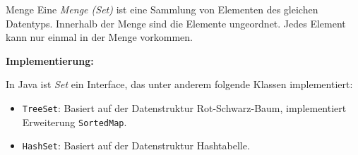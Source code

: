 \documentclass[german]{../spicker}
\begin{document}
\begin{defi}{Menge}
    Eine \emph{Menge (Set)} ist eine Sammlung von Elementen des gleichen Datentyps.
    Innerhalb der Menge sind die Elemente ungeordnet.
    Jedes Element kann nur einmal in der Menge vorkommen.

    \textbf{Implementierung:}

    In Java ist \emph{Set} ein Interface, das unter anderem folgende Klassen implementiert:
    \begin{itemize}
        \item \texttt{TreeSet}: Basiert auf der Datenstruktur Rot-Schwarz-Baum, implementiert Erweiterung \texttt{SortedMap}.
        \item \texttt{HashSet}: Basiert auf der Datenstruktur Hashtabelle.
    \end{itemize}
\end{defi}
\end{document}
